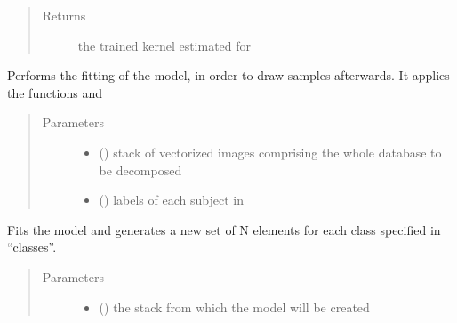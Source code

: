\documentclass[letterpaper,10pt,english]{sphinxmanual}
\begin{document}
\begin{fulllineitems}
\begin{fulllineitems}
\begin{quote}
\begin{description}
\item[{Returns}] \leavevmode
the trained kernel estimated for 

\end{description}\end{quote}

\end{fulllineitems}


\begin{fulllineitems}
\label{\detokenize{api:brainSimulator.BrainSimulator.fit}}
Performs the fitting of the model, in order to draw samples afterwards.
It applies the functions  and 
\begin{quote}\begin{description}
\item[{Parameters}] \leavevmode\begin{itemize}
\item {} 
 () \textendash{} stack of vectorized images comprising the whole database to be decomposed

\item {} 
 () \textendash{} labels of each subject in 

\end{itemize}

\end{description}\end{quote}

\end{fulllineitems}


\begin{fulllineitems}
\label{\detokenize{api:brainSimulator.BrainSimulator.generateDataset}}
Fits the model and generates a new set of N elements for each class
specified in “classes”.
\begin{quote}\begin{description}
\item[{Parameters}] \leavevmode\begin{itemize}
\item {} 
 () \textendash{} the stack from which the model will be created


\end{itemize}
\end{description}
\end{quote}
\end{fulllineitems}
\end{fulllineitems}
\end{document}
